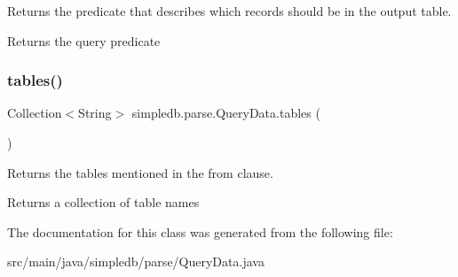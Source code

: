 Returns the predicate that describes which records should be in the output table. \begin{DoxyReturn}{Returns}
the query predicate 
\end{DoxyReturn}
\mbox{\label{classsimpledb_1_1parse_1_1QueryData_a3faec3eb9571200bc9c6153ef1e43992}} 
\subsubsection{\texorpdfstring{tables()}{tables()}}
{\footnotesize\ttfamily Collection$<$String$>$ simpledb.\+parse.\+Query\+Data.\+tables (\begin{DoxyParamCaption}{ }\end{DoxyParamCaption})\hspace{0.3cm}{\ttfamily [inline]}}

Returns the tables mentioned in the from clause. \begin{DoxyReturn}{Returns}
a collection of table names 
\end{DoxyReturn}


The documentation for this class was generated from the following file\+:\begin{DoxyCompactItemize}
\item 
src/main/java/simpledb/parse/Query\+Data.\+java\end{DoxyCompactItemize}
